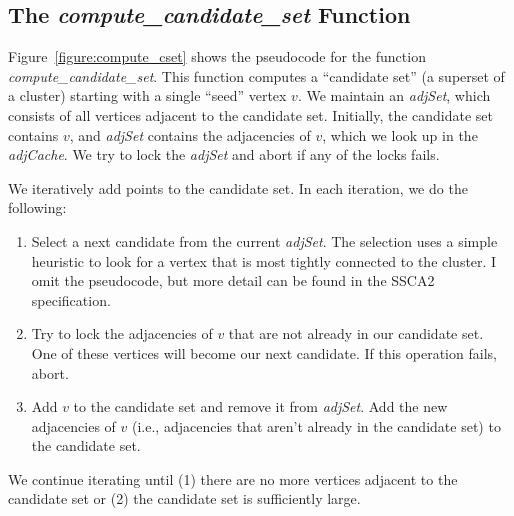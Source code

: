 \documentclass[10pt]{article}
\begin{document}
\begin{sloppypar}
\subsection{The \emph{compute\_candidate\_set} Function}
\label{section:compute_cset}

Figure~\ref{figure:compute_cset} shows the pseudocode for the function
\emph{compute\_candidate\_set}.  This function computes a ``candidate
set'' (a superset of a cluster) starting with a single ``seed'' vertex
$v$.  We maintain an \emph{adjSet}, which consists of all vertices
adjacent to the candidate set.  Initially, the candidate set contains
$v$, and \emph{adjSet} contains the adjacencies of $v$, which we look
up in the \emph{adjCache}.  We try to lock the \emph{adjSet} and abort
if any of the locks fails.

We iteratively add points to the candidate set.  In each iteration, we
do the following:
\begin{enumerate}
\item Select a next candidate from the current \emph{adjSet}.  The
selection uses a simple heuristic to look for a vertex that is most
tightly connected to the cluster.  I omit the pseudocode, but more
detail can be found in the SSCA2 specification.
\item Try to lock the adjacencies of $v$ that are not already in our
  candidate set.  One of these vertices will become our next
  candidate.  If this operation fails, abort.
\item Add $v$ to the candidate set and remove it from \emph{adjSet}.
  Add the new adjacencies of $v$ (i.e., adjacencies that aren't
  already in the candidate set) to the candidate set.
\end{enumerate}
We continue iterating until (1) there are no more vertices adjacent to
the candidate set or (2) the candidate set is sufficiently large.


\end{sloppypar}
\end{document}
